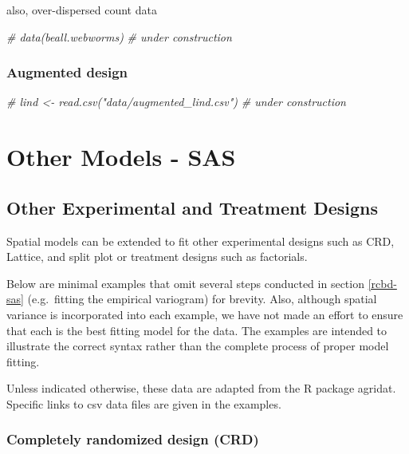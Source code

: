 \documentclass[
]{book}
\newenvironment{Shaded}{\begin{snugshade}}{\end{snugshade}}
\newcommand{\CommentTok}[1]{\textcolor[rgb]{0.56,0.35,0.01}{\textit{#1}}}
\begin{document}
also, over-dispersed count data

\begin{Shaded}
\begin{Highlighting}[]
\CommentTok{\# data(beall.webworms)  }
\CommentTok{\# under construction}
\end{Highlighting}
\end{Shaded}

\hypertarget{augmented-design}{%
\subsection{Augmented design}\label{augmented-design}}

\begin{Shaded}
\begin{Highlighting}[]
\CommentTok{\# lind \textless{}{-} read.csv("data/augmented\_lind.csv")}
\CommentTok{\# under construction}
\end{Highlighting}
\end{Shaded}

\hypertarget{model-extension-sas}{%
\chapter{Other Models - SAS}\label{model-extension-sas}}

\hypertarget{other-experimental-and-treatment-designs-1}{%
\section{Other Experimental and Treatment Designs}\label{other-experimental-and-treatment-designs-1}}

Spatial models can be extended to fit other experimental designs such as CRD, Lattice, and split plot or treatment designs such as factorials.

Below are minimal examples that omit several steps conducted in section \ref{rcbd-sas} (e.g.~fitting the empirical variogram) for brevity. Also, although spatial variance is incorporated into each example, we have not made an effort to ensure that each is the best fitting model for the data. The examples are intended to illustrate the correct syntax rather than the complete process of proper model fitting.

Unless indicated otherwise, these data are adapted from the R package agridat. Specific links to csv data files are given in the examples.

\hypertarget{completely-randomized-design-crd}{%
\subsection{Completely randomized design (CRD)}\label{completely-randomized-design-crd}}
\end{document}
